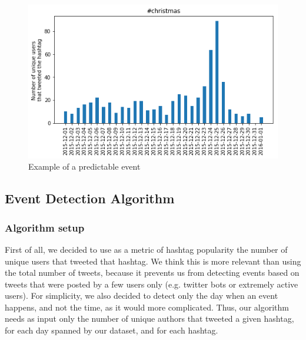 \documentclass[11pt]{article}
\begin{document}
\begin{figure}[htbp]
  \vspace*{-1mm}
  \centering
  \includegraphics[width=\columnwidth]{figures/freq_event_type2.png}
  \vspace{-5mm}
  \caption{Example of a predictable event}
  \label{fig:predictable_event}
\end{figure}

\subsection{Event Detection Algorithm}
\subsubsection{Algorithm setup}
First of all, we decided to use as a metric of hashtag popularity the number of unique users that tweeted that hashtag. We think this is more relevant than using the total number of tweets, because it prevents us from detecting events based on tweets that were posted by a few users only (e.g. twitter bots or extremely active users). For simplicity, we also decided to detect only the day when an event happens, and not the time, as it would more complicated. Thus, our algorithm needs as input only the number of unique authors that tweeted a given hashtag, for each day spanned by our dataset, and for each hashtag.
\end{document}
